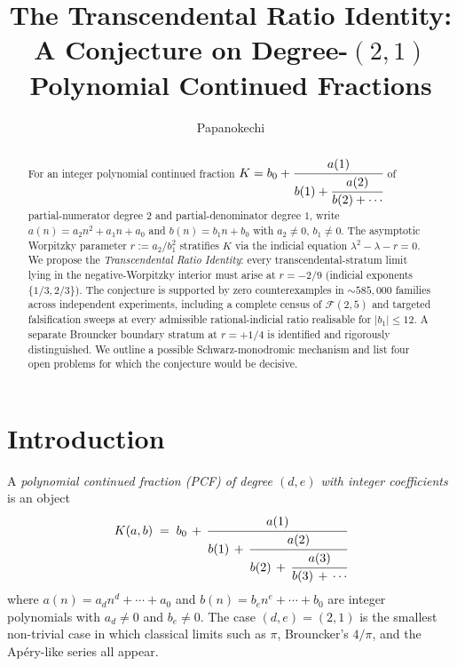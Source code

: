 \documentclass[11pt]{amsart}
\title[The Transcendental Ratio Identity]{The Transcendental Ratio
Identity: A Conjecture on Degree-$(2,1)$ Polynomial Continued Fractions}
\author{Papanokechi}
\theoremstyle{definition}
\theoremstyle{remark}
\newcommand{\FF}{\mathcal{F}}
\begin{document}
\begin{abstract}
For an integer polynomial continued fraction
$K = b_0 + \cfrac{a(1)}{b(1) + \cfrac{a(2)}{b(2) + \cdots}}$
of partial-numerator degree $2$ and partial-denominator degree $1$,
write $a(n) = a_2 n^2 + a_1 n + a_0$ and $b(n) = b_1 n + b_0$ with
$a_2 \ne 0$, $b_1 \ne 0$.  The asymptotic Worpitzky parameter
$r := a_2 / b_1^2$ stratifies $K$ via the indicial equation
$\lambda^2 - \lambda - r = 0$.  We propose the
\emph{Transcendental Ratio Identity}: every transcendental-stratum
limit lying in the negative-Worpitzky interior must arise at
$r = -2/9$ (indicial exponents $\{1/3, 2/3\}$).  The conjecture is
supported by zero counterexamples in $\sim 585{,}000$ families
across independent experiments, including a complete census of
$\FF(2,5)$ and targeted falsification sweeps at every admissible
rational-indicial ratio realisable for $|b_1| \le 12$.  A separate Brouncker
boundary stratum at $r = +1/4$ is identified and rigorously
distinguished.  We outline a possible Schwarz-monodromic mechanism
and list four open problems for which the conjecture would be
decisive.
\end{abstract}

\maketitle

\section{Introduction}

A \emph{polynomial continued fraction (PCF) of degree $(d, e)$ with
integer coefficients} is an object
\begin{equation}\label{eq:pcf}
  K(a, b) \;=\; b_0 \,+\, \cfrac{a(1)}{b(1) \,+\, \cfrac{a(2)}{b(2)
  \,+\, \cfrac{a(3)}{b(3) \,+\, \cdots}}}
\end{equation}
where
\(
a(n) = a_d n^d + \cdots + a_0
\)
and
\(
b(n) = b_e n^e + \cdots + b_0
\)
are integer polynomials with $a_d \ne 0$ and $b_e \ne 0$.  The case
$(d,e) = (2,1)$ is the smallest non-trivial case in which classical
limits such as $\pi$, Brouncker's $4/\pi$, and the Ap\'ery-like series
all appear.
\end{document}
